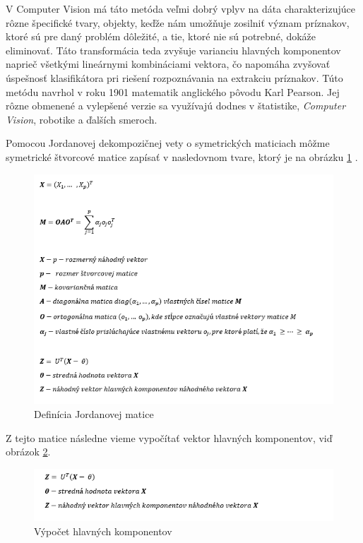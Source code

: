 V Computer Vision má táto metóda veľmi dobrý vplyv na dáta charakterizujúce rôzne špecifické tvary, objekty, keďže nám umožňuje zosilniť význam príznakov, ktoré sú pre daný problém dôležité, a tie, ktoré nie sú potrebné, dokáže eliminovať. Táto transformácia teda zvyšuje varianciu hlavných komponentov naprieč všetkými lineárnymi kombináciami vektora, čo napomáha zvyšovať úspešnosť klasifikátora pri riešení rozpoznávania na extrakciu príznakov. Túto metódu navrhol v roku 1901 matematik anglického pôvodu Karl Pearson. Jej rôzne obmenené a vylepšené verzie sa využívajú dodnes v štatistike, \textit{Computer Vision}, robotike a ďalších smeroch.

Pomocou Jordanovej dekompozičnej vety o symetrických maticiach môžme symetrické štvorcové matice zapísať v nasledovnom tvare, ktorý je na obrázku \ref{PCAJord} \cite{c15} \cite{c16}.
\begin{figure}[H]
  \centering
  \includegraphics[width=16cm]{img/PCAjordan.png}
  \caption{Definícia Jordanovej matice}
  \label{PCAJord}
\end{figure}

Z tejto matice následne vieme vypočítať vektor hlavných komponentov, viď obrázok \ref{PCAhlav}.

\begin{figure}[H]
  \centering
  \includegraphics[width=16cm]{img/PCAhlavnekomponenty.png}
  \caption{Výpočet hlavných komponentov}
  \label{PCAhlav}
\end{figure}
\cite{c17}

